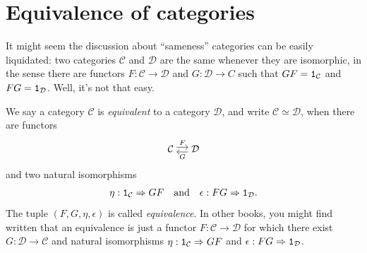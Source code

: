 

\section{Equivalence of categories}

It might seem the discussion about ``sameness'' categories can be easily
liquidated: two categories \(\mathcal{C}\) and \(\mathcal{D}\) are the same whenever they are isomorphic, in
the sense there are functors \(F : \mathcal{C} \to \mathcal{D}\) and \(G : \mathcal{D} \to
C\) such that \(GF = \mathtt 1_{\mathcal{C}}\) and \(FG = \mathtt 1_{\mathcal{D}}\). Well,
it's not that easy.

\begin{definition}
  We say a category \(\mathcal{C}\) is {\em equivalent} to a category
  \(\mathcal{D}\), and write \(\mathcal{C} \simeq \mathcal{D}\), when there are functors
  \[
    \begin{tikzcd}[column sep=small, cramped] \mathcal{C} \ar["{F}", r, shift
      left] & \mathcal{D} \ar["{G}", l, shift left] \end{tikzcd}
  \]
  and two natural isomorphisms
  \[
    \eta : \mathtt 1_{\mathcal{C}} \Rightarrow GF \quad\text{and}\quad \epsilon : FG \Rightarrow \mathtt 1_{\mathcal{D}} .
  \]
  The tuple \((F, G, \eta, \epsilon)\) is called {\em equivalence}. In other
  books, you might find written that an equivalence is just a functor
  \(F : \mathcal{C} \to \mathcal{D}\) for which there exist
  \(G : \mathcal{D} \to \mathcal{C}\) and natural isomorphisms
  \(\eta : \mathtt 1_{\mathcal{C}} \Rightarrow GF\) and \(\epsilon : FG \Rightarrow \mathtt 1_{\mathcal{D}}\).
\end{definition}

